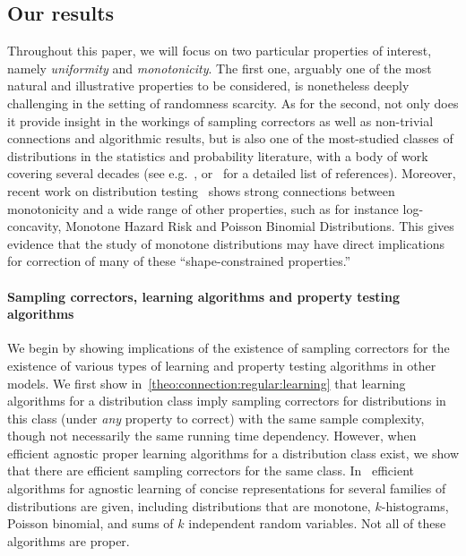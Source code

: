 \subsection{Our results}

Throughout this paper, we will focus on two particular properties of interest, 
namely \emph{uniformity} and \emph{monotonicity}. 
The first one, arguably one of the most natural and illustrative properties to be considered, 
is nonetheless deeply challenging in the setting of randomness scarcity. As for the second, 
not only does it provide insight in the workings of sampling correctors as well as non-trivial connections and algorithmic results, 
but is also one of the most-studied classes of distributions in the statistics and probability literature, with a body of work covering several decades (see 
e.g.~\cite{Grenander:56,Birge:87,BKR:04,DDS:12}, or~\cite{DDSVV:13} for a detailed list of references). 
Moreover, recent work on distribution testing~\cite{DDSVV:13,CDGR:16} shows strong 
connections between monotonicity and a wide range of other properties, 
such as for instance log-concavity, Monotone Hazard Risk and Poisson Binomial Distributions. 
This gives evidence that the study of monotone distributions may have direct implications for 
correction of many of these ``shape-constrained properties.''

\paragraph{Sampling correctors, learning algorithms and property testing algorithms}
We begin by showing implications of the existence of
sampling correctors for the existence of various types of learning and property
testing algorithms in other 
models. We first show in~\cref{theo:connection:regular:learning} that learning algorithms for a distribution class
imply sampling correctors for distributions in this class (under
 \emph{any} property to correct) with the same sample complexity,
though not necessarily the same running time dependency.  
However,  when efficient agnostic proper
learning algorithms for a distribution class
exist, {we show that} there are efficient sampling correctors 
for the same class.
In~\cite{Birge:87,CDSS:14} efficient algorithms for agnostic learning of
concise representations
for several families of distributions are given, including distributions
that are monotone, $k$-histograms, Poisson binomial, and sums of $k$ independent
random variables.  Not all of these algorithms are proper. 

